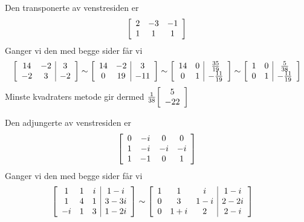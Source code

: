 \documentclass[11pt, a4paper, norsk]{NTNUoving}
\newenvironment{pkt}{\begin{punkt}}{\end{punkt}}
\newenvironment{matrise}[1][c]
{
\left[\begin{array}{#1}
}
{    
\end{array}\right]           
}
\begin{document}
\begin{oppgave}
    \begin{pkt}
    
        Den transponerte av venstresiden er $$\begin{matrise}[ccc]
            2 & -3 & -1 \\1 & 1 & 1 
        \end{matrise}$$
        Ganger vi den med begge sider får vi $$\begin{matrise}[cc|c]
            14 & -2 & 3\\ -2 & 3 & -2
        \end{matrise} \sim \begin{matrise}[cc|c]
            14 & -2 & 3\\ 0 & 19 & -11
        \end{matrise} \sim \begin{matrise}[cc|c]
            14 & 0 & \frac{35}{19}\\ 0 & 1 & -\frac{11}{19}
        \end{matrise} \sim \begin{matrise}[cc|c]
            1 & 0 & \frac{5}{38}\\ 0 & 1 & -\frac{11}{19}
        \end{matrise}$$
        Minste kvadraters metode gir dermed $\frac{1}{38}\begin{matrise}
        5  \\ -22 
        \end{matrise}$
    \end{pkt}
    \begin{pkt}
        Den adjungerte av venstresiden er $$\begin{matrise}[cccc]
            0 & -i & 0 & 0 \\ 1 & -i & -i & -i \\ 1 & -1 & 0 & 1 
        \end{matrise}$$
        Ganger vi den med begge sider får vi 
        \begin{align*}
        &\begin{matrise}[ccc|c]
            1 & 1 & i & 1-i \\ 1 & 4 & 1 & 3-3i \\ -i & 1 & 3 & 1-2i
        \end{matrise} \sim \begin{matrise}[ccc|c]
            1 & 1 & i & 1-i \\ 0 & 3 & 1-i & 2-2i \\ 0 & 1+i & 2 & 2-i

\end{matrise}
\end{align*}
\end{pkt}
\end{oppgave}
\end{document}
